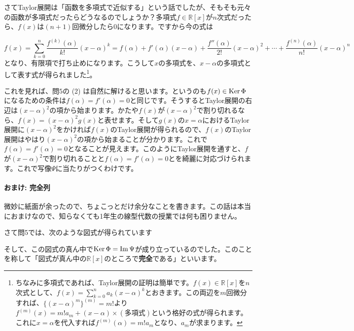 さてTaylor展開は「函数を多項式で近似する」という話でしたが、そもそも元々の函数が多項式だったらどうなるのでしょうか？多項式$f\in\mathbb{R}[x]$が$n$次式だったら、$f(x)$は$(n+1)$回微分したら$0$になります。ですから今の式は

\[
f(x) = \sum_{k = 0}^{n} \frac{f^{(k)}(\alpha)}{k!} (x - \alpha)^k = f(\alpha) + f'(\alpha)(x - \alpha) + \frac{f''(\alpha)}{2!}(x - \alpha)^2 + \cdots + \frac{f^{(n)}(\alpha)}{n!}(x - \alpha)^n
\]
となり、有限項で打ち止めになります。こうして$x$の多項式を、$x - \alpha$の多項式として表す式が得られました\footnote{ちなみに多項式であれば、Taylor展開の証明は簡単です。$f(x)\in\mathbb{R}[x]$を$n$次式として、$f(x) = \sum_{k = 0}^n a_k (x - \alpha)^k$とおきます。この両辺を$m$回微分すれば、$\bigl\{(x - \alpha)^m\bigr\}^{(m)} = m!$より$f^{(m)}(x) = m!a_m + (x - \alpha)\times(\text{多項式})$という格好の式が得られます。これに$x = \alpha$を代入すれば$f^{(m)}(\alpha) = m! a_m$となり、$a_m$が求まります。}。

これを見れば、問$5$の (2) は自然に解けると思います。というのも$f(x)\in \operatorname{Ker} \Phi$になるための条件は$f(\alpha) = f'(\alpha) = 0$と同じです。そうするとTaylor展開の右辺は$(x - \alpha)^2$の項から始まります。かたや$f(x)$が$(x - \alpha)^2$で割り切れるなら、$f(x) = (x - \alpha)^2 g(x)$と表せます。そして$g(x)$の$x = \alpha$におけるTaylor展開に$(x - \alpha)^2$をかければ$f(x)$のTaylor展開が得られるので、$f(x)$のTaylor展開はやはり$(x - \alpha)^2$の項から始まることが分かります。これで$f(\alpha) = f'(\alpha) = 0$となることが見えます。このようにTaylor展開を通すと、$f$が$(x - \alpha)^2$で割り切れることと$f(\alpha) = f'(\alpha) = 0$とを綺麗に対応づけられます。これで写像$\Psi$に当たりがつくわけです。

\newpage

\paragraph{おまけ: 完全列} 微妙に紙面が余ったので、ちょこっとだけ余分なことを書きます。この話は本当におまけなので、知らなくても1年生の線型代数の授業では何も困りません。

さて問5では、次のような図式が得られています
\begin{center}
\end{center}
そして、この図式の真ん中で$\operatorname{Ker} \Phi = \mathrm{Im}\, \Psi$が成り立っているのでした。このことを称して「図式が真ん中の$\mathbb{R}[x]$のところで\textbf{完全}である」といいます。

